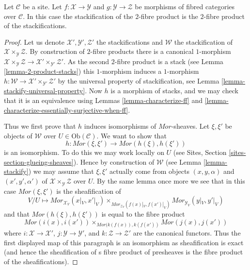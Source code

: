 \begin{lemma}
\label{lemma-stackification-fibre-product-fibred-categories}
Let $\mathcal{C}$ be a site.
Let $f : \mathcal{X} \to \mathcal{Y}$ and $g : \mathcal{Y} \to \mathcal{Z}$
be morphisms of fibred categories over $\mathcal{C}$.
In this case the stackification of the $2$-fibre product is the $2$-fibre
product of the stackifications.
\end{lemma}

\begin{proof}
Let us denote $\mathcal{X}', \mathcal{Y}', \mathcal{Z}'$ the stackifications
and $\mathcal{W}$ the stackification of
$\mathcal{X} \times_{\mathcal{Y}} \mathcal{Z}$. By construction of $2$-fibre
products there is a canonical $1$-morphism
$\mathcal{X} \times_{\mathcal{Y}} \mathcal{Z} \to
\mathcal{X}' \times_{\mathcal{Y}'} \mathcal{Z}'$.
As the second $2$-fibre product is a stack (see
Lemma \ref{lemma-2-product-stacks})
this $1$-morphism induces a $1$-morphism
$h : \mathcal{W} \to \mathcal{X}' \times_{\mathcal{Y}'} \mathcal{Z}'$
by the universal property of stackification, see
Lemma \ref{lemma-stackify-universal-property}.
Now $h$ is a morphism of stacks, and we may check that it is an
equivalence using
Lemmas \ref{lemma-characterize-ff} and
\ref{lemma-characterize-essentially-surjective-when-ff}.

\medskip\noindent
Thus we first prove that $h$ induces isomorphisms of $\mathit{Mor}$-sheaves.
Let $\xi, \xi'$ be objects of $\mathcal{W}$ over
$U \in \text{Ob}(\mathcal{C})$. We want to show that
$$
h : \mathit{Mor}(\xi, \xi') \longrightarrow \mathit{Mor}(h(\xi), h(\xi'))
$$
is an isomorphism. To do this we may work locally on $U$ (see
Sites, Section \ref{sites-section-glueing-sheaves}).
Hence by construction of $\mathcal{W}$ (see
Lemma \ref{lemma-stackify})
we may assume that $\xi, \xi'$
actually come from objects $(x, y, \alpha)$ and $(x', y', \alpha')$
of $\mathcal{X} \times_{\mathcal{Y}} \mathcal{Z}$ over $U$.
By the same lemma once more we see that in this case
$\mathit{Mor}(\xi, \xi')$ is the sheafification of
$$
V/U \longmapsto
\textit{Mor}_{\mathcal{X}_V}(x|_V, x'|_V)
\times_{\textit{Mor}_{\mathcal{Z}_V}(f(x)|_V, f(x')|_V)}
\textit{Mor}_{\mathcal{Y}_V}(y|_V, y'|_V)
$$
and that $\mathit{Mor}(h(\xi), h(\xi'))$ is equal to the fibre product
$$
\textit{Mor}(i(x), i(x'))
\times_{\mathit{Mor}(k(f(x)), k(f(x'))}
\textit{Mor}(j(x), j(x'))
$$
where $i : \mathcal{X} \to \mathcal{X}'$,
$j : \mathcal{Y} \to \mathcal{Y}'$, and
$k : \mathcal{Z} \to \mathcal{Z}'$ are the canonical functors.
Thus the first displayed map of this paragraph is an isomorphism as
sheafification is exact (and hence the sheafification of s fibre product
of presheaves is the fibre product of the sheafifications).


\end{proof}
